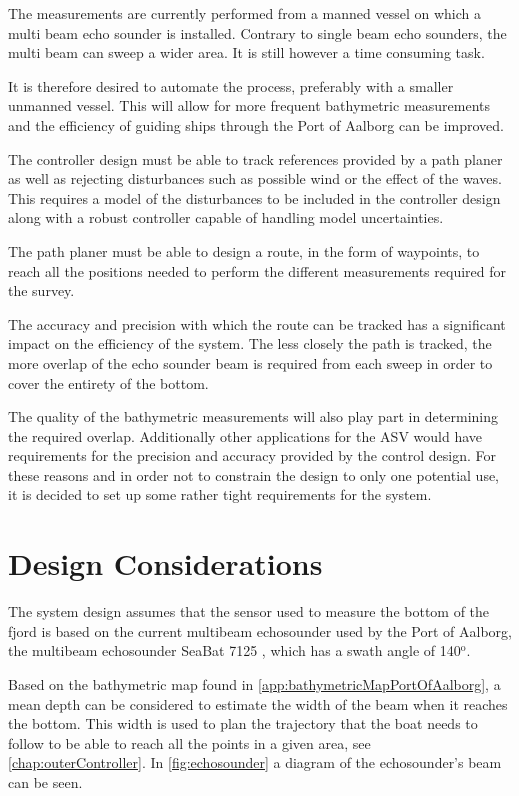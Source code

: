 The measurements are currently performed from a manned vessel on which a multi beam echo sounder is installed. Contrary to single beam echo sounders, the multi beam can sweep a wider area. It is still however a time consuming task.

It is therefore desired to automate the process, preferably with a smaller unmanned vessel. This will allow for more frequent bathymetric measurements and the efficiency of guiding ships through the Port of Aalborg can be improved.

The controller design must be able to track references provided by a path planer as well as rejecting disturbances such as possible wind or the effect of the waves. This requires a model of the disturbances to be included in the controller design along with a robust controller capable of handling model uncertainties.

The path planer must be able to design a route, in the form of waypoints, to reach all the positions needed to perform the different measurements required for the survey.

The accuracy and precision with which the route can be tracked has a significant impact on the efficiency of the system. The less closely the path is tracked, the more overlap of the echo sounder beam is required from each sweep in order to cover the entirety of the bottom.

The quality of the bathymetric measurements will also play part in determining the required overlap. Additionally other applications for the ASV would have requirements for the precision and accuracy provided by the control design. For these reasons and in order not to constrain the design to only one potential use, it is decided to set up some rather tight requirements for the system.

\section{Design Considerations}
The system design assumes that the sensor used to measure the bottom of the fjord is based on the current multibeam echosounder used by the Port of Aalborg, the multibeam echosounder SeaBat 7125 \cite{echoSounder}, which has a swath angle of 140$^\mathrm{o}$.

Based on the bathymetric map found in \autoref{app:bathymetricMapPortOfAalborg}, a mean depth can be considered to estimate the width of the beam when it reaches the bottom. This width is used to plan the trajectory that the boat needs to follow to be able to reach all the points in a given area, see \autoref{chap:outerController}. In \autoref{fig:echosounder} a diagram of the echosounder's beam can be seen.


